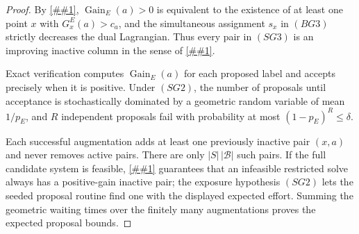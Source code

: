 \documentclass[10pt]{article}
\newcommand{\cref}[1]{\ref{##1}}
\theoremstyle{definition}
\begin{document}
\begin{proof}
   By \cref{cor:whole-bucket-reduced-gain}, \(\operatorname{Gain}_E(a)>0\)
   is equivalent to the existence of at least one point \(x\) with
   \(G_x^E(a)>c_a\), and the simultaneous assignment \(s_x\) in \((BG3)\)
   strictly decreases the dual Lagrangian.  Thus every pair in \((SG3)\) is an
   improving inactive column in the sense of
   \cref{lem:finite-rate-coverage-column-generation}.

   Exact verification computes \(\operatorname{Gain}_E(a)\) for each proposed
   label and accepts precisely when it is positive.  Under \((SG2)\), the
   number of proposals until acceptance is stochastically dominated by a
   geometric random variable of mean \(1/p_E\), and \(R\) independent proposals
   fail with probability at most \((1-p_E)^R\le\delta\).

   Each successful augmentation adds at least one previously inactive pair
   \((x,a)\) and never removes active pairs.  There are only
   \(|S|\,|\mathcal B|\) such pairs.  If the full candidate system is feasible,
   \cref{lem:finite-rate-coverage-column-generation} guarantees that an
   infeasible restricted solve always has a positive-gain inactive pair; the
   exposure hypothesis \((SG2)\) lets the seeded proposal routine find one with
   the displayed expected effort.  Summing the geometric waiting times over the
   finitely many augmentations proves the expected proposal bounds.
\end{proof}
\end{document}
